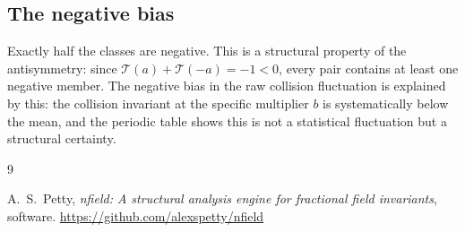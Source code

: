 \documentclass[12pt]{amsart}
\theoremstyle{definition}
\theoremstyle{remark}
\begin{document}
\subsection*{The negative bias}

Exactly half the classes are negative. This is a structural
property of the antisymmetry: since $\mathcal{T}(a) +
\mathcal{T}(-a) = -1 < 0$, every pair contains at least one
negative member. The negative bias in the raw collision
fluctuation is explained by this: the collision invariant at
the specific multiplier $b$ is systematically below the mean, and the
periodic table shows this is not a statistical fluctuation
but a structural certainty.

\begin{thebibliography}{9}

A.~S.~Petty,
\emph{nfield: A structural analysis engine for fractional
field invariants}, software.
\url{https://github.com/alexspetty/nfield}

\end{thebibliography}
\end{document}
